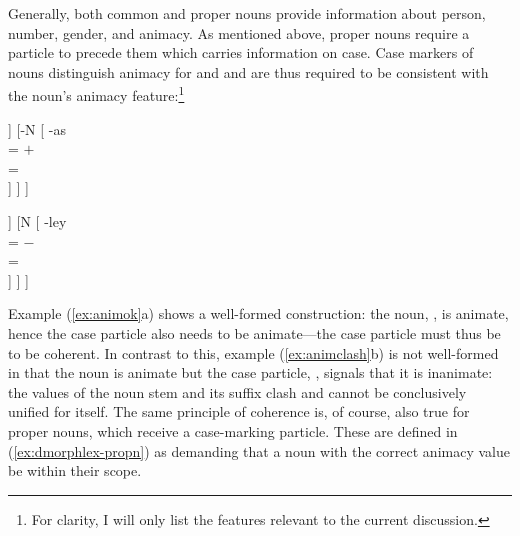 \xe

Generally, both common and proper nouns provide information about person, 
number, gender, and animacy. As mentioned above, proper nouns require a 
particle to precede them which carries information on case. Case markers of 
nouns distinguish animacy for \Aarg{} and \Parg{} and are thus required to be 
consistent with the noun's animacy feature:\footnote{For clarity, I will only 
list the features relevant to the current discussion.}

\ex{}%
\begin{minipage}[t]{.5\linewidth}
\tl\label{ex:animok}\quad %
\begin{forest}
[{%
\xhead{N} \\
\ups{\Anim} = $+$ \\
\ups{\Case} = \Parg{}
}
	[N\tsub{stem}
		[{%
			gan \\
			\ups{\Anim} = $+$ \\
		}]
	]
	[-N
		[{%
			-as \\
			\ups{\Anim} = $+$ \\
			\ups{\Case} = \Parg{} \\
		}]
	]
]
\end{forest}
\end{minipage}
\begin{minipage}[t]{.5\linewidth}
\tl\label{ex:animclash}\quad %
\ljudge*\begin{forest}
[{%
\xhead{N} \\
\ups{\Anim} = \err{} \\
\ups{\Case} = \Parg{}
}
	[N\tsub{stem}
		[{%
			gan \\
			\ups{\Anim} = $+$ \\
		}]
	]
	[N
		[{%
			-ley \\
			\ups{\Anim} = $-$ \\
			\ups{\Case} = \Parg{} \\
		}]
	]
]
\end{forest}
\end{minipage}
\xe

Example (\ref{ex:animok}a) shows a well-formed construction: the noun, 
, is animate, hence the case particle also needs to be 
animate---the case particle must thus be  to be coherent. In 
contrast to this, example (\ref{ex:animclash}b) is not well-formed in that the 
noun is animate but the case particle, , signals that 
it is inanimate: the \Anim{} values of the noun stem and its suffix 
clash and cannot be conclusively unified for  itself. The 
same principle of coherence is, of course, also true for proper nouns, which 
receive a case-marking particle. These are defined in (\ref{ex:dmorphlex-propn}) 
as demanding that a noun with the correct animacy value be within their scope.

